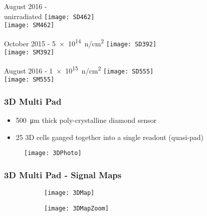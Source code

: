 \begin{frame}
	\begin{minipage}{3.1cm}
		\centering
		August 2016 - \\unirradiated
		\texttt{[image: SD462]}\\
		\texttt{[image: SM462]}
	\end{minipage}
	\hspace*{2pt}
	\begin{minipage}{3.1cm}
		\centering
		October 2015 - \SI[exponent-product = \cdot]{5e14}{n/cm^{2}}
		\texttt{[image: SD392]}\\
		\texttt{[image: SM392]}
	\end{minipage}
	\hspace*{2pt}
	\begin{minipage}{3.1cm}
		\centering
		August 2016 - \SI[exponent-product = \cdot]{1e15}{n/cm^{2}}
		\texttt{[image: SD555]}\\
		\texttt{[image: SM555]}
	\end{minipage}\s
\end{frame}
\begin{frame}
	\frametitle{3D Multi Pad}
	\begin{itemize}
		\item \SI{500}{\micro\meter} thick poly-crystalline diamond sensor
		\item 25 3D cells ganged together into a single readout (quasi-pad)
	\end{itemize}
	\begin{figure}
		\centering
		\texttt{[image: 3DPhoto]}
	\end{figure}
\end{frame}
\begin{frame}
	\frametitle{3D Multi Pad - Signal Maps}
	\begin{figure}
		\centering
		\begin{subfigure}[t]{0.45\textwidth}
			\centering
			\texttt{[image: 3DMap]}
		\end{subfigure}
		\begin{subfigure}[t]{0.45\textwidth}
			\centering
			\texttt{[image: 3DMapZoom]}
		\end{subfigure}
	\end{figure}
\end{frame}
